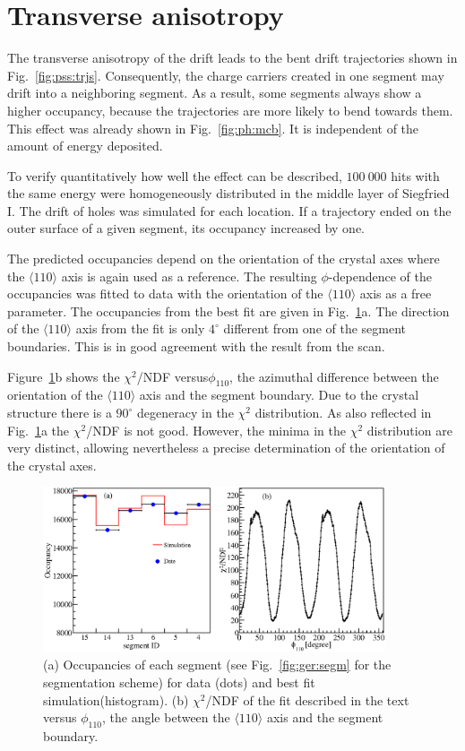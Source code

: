 \section{Transverse anisotropy}
\label{sec:psa:tra}
The transverse anisotropy of the drift leads to the bent drift
trajectories shown in Fig.~\ref{fig:pss:trjs}. Consequently, the
charge carriers created in one segment may drift into a neighboring
segment. As a result, some segments always show a higher occupancy,
because the trajectories are more likely to bend towards them. This
effect was already shown in Fig.~\ref{fig:ph:mcb}. It is independent
of the amount of energy deposited.

To verify quantitatively how well the effect can be described, $100\
000$ hits with the same energy were homogeneously distributed in the
middle layer of Siegfried I. The drift of holes was simulated for each
location. If a trajectory ended on the outer surface of a given
segment, its occupancy increased by one.

The predicted occupancies depend on the orientation of the crystal
axes where the $\langle 110 \rangle$ axis is again used as a
reference.  The resulting $\phi$-dependence of the occupancies was
fitted to data with the orientation of the $\langle 110 \rangle$ axis
as a free parameter. The occupancies from the best fit are given in
Fig.~\ref{fig:psa:focc}a.  The direction of the $\langle 110 \rangle$
axis from the fit is only $4^\circ$ different from one of the segment
boundaries. This is in good agreement with the result from the scan.

Figure~\ref{fig:psa:focc}b shows the $\chi^2$/NDF versus$\phi_{110}$,
the azimuthal difference between the orientation of the $\langle 110
\rangle$ axis and the segment boundary. Due to the crystal structure
there is a $90^{\circ}$ degeneracy in the $\chi^2$ distribution.  As
also reflected in Fig.~\ref{fig:psa:focc}a the $\chi^2$/NDF is not
good. However, the minima in the $\chi^2$ distribution are very
distinct, allowing nevertheless a precise determination of the
orientation of the crystal axes.

\begin{figure}[htbp]
\centering
\includegraphics[width=0.9\textwidth]{fitocc}
\caption{(a) Occupancies of each segment (see Fig.~\ref{fig:ger:segm}
for the segmentation scheme) for data (dots) and best fit
simulation(histogram). (b) $\chi^{2}$/NDF of the fit described in the
text versus $\phi_{110}$, the angle between the $\langle 110 \rangle$
axis and the segment boundary.}
\label{fig:psa:focc}
\end{figure}

